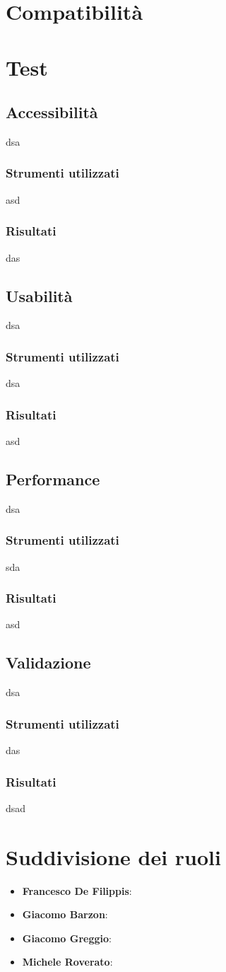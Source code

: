 \documentclass[12pt]{article}
\begin{document}
	\section{Compatibilità}
	
	\section{Test}
	\subsection{Accessibilità}
	dsa
	\subsubsection{Strumenti utilizzati}
	asd
	\subsubsection{Risultati}
	das
	
	\subsection{Usabilità}
	dsa
	\subsubsection{Strumenti utilizzati}
	dsa
	\subsubsection{Risultati}
	asd
	
	\subsection{Performance}
	dsa
	\subsubsection{Strumenti utilizzati}
	sda
	\subsubsection{Risultati}
	asd

	\subsection{Validazione}
	dsa
	\subsubsection{Strumenti utilizzati}
	das
	\subsubsection{Risultati}
	dsad
	
	\section{Suddivisione dei ruoli}
	
	\begin{itemize}
		\item \textbf{Francesco De Filippis}: 
		\item \textbf{Giacomo Barzon}:
		\item \textbf{Giacomo Greggio}:
		\item \textbf{Michele Roverato}:
	\end{itemize}
\end{document}
